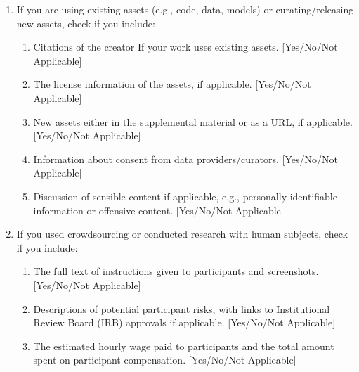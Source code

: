 \documentclass[twoside]{article}
\theoremstyle{definition}
\begin{document}
\begin{enumerate}
 \item If you are using existing assets (e.g., code, data, models) or curating/releasing new assets, check if you include:
 \begin{enumerate}
   \item Citations of the creator If your work uses existing assets. [Yes/No/Not Applicable]
   \item The license information of the assets, if applicable. [Yes/No/Not Applicable]
   \item New assets either in the supplemental material or as a URL, if applicable. [Yes/No/Not Applicable]
   \item Information about consent from data providers/curators. [Yes/No/Not Applicable]
   \item Discussion of sensible content if applicable, e.g., personally identifiable information or offensive content. [Yes/No/Not Applicable]
 \end{enumerate}

 \item If you used crowdsourcing or conducted research with human subjects, check if you include:
 \begin{enumerate}
   \item The full text of instructions given to participants and screenshots. [Yes/No/Not Applicable]
   \item Descriptions of potential participant risks, with links to Institutional Review Board (IRB) approvals if applicable. [Yes/No/Not Applicable]
   \item The estimated hourly wage paid to participants and the total amount spent on participant compensation. [Yes/No/Not Applicable]
 \end{enumerate}

 \end{enumerate}
\end{document}

